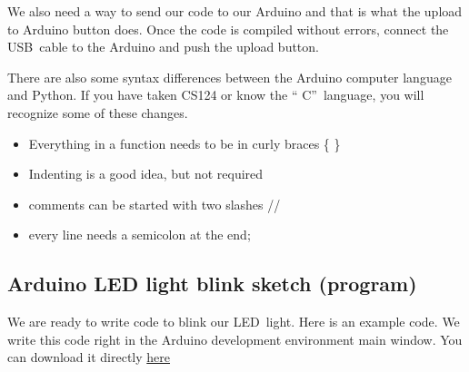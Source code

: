 We also need a way to send our code to our Arduino and that is what the
upload to Arduino button does. Once the code is compiled without errors,
connect the USB\ cable to the Arduino and push the upload button.

There are also some syntax differences between the Arduino computer language
and Python. If you have taken CS124 or know the \textquotedblleft
C\textquotedblright\ language, you will recognize some of these changes.

\begin{itemize}
\item Everything in a function needs to be in curly braces \{ \}

\item Indenting is a good idea, but not required

\item comments can be started with two slashes //

\item every line needs a semicolon at the end;
\end{itemize}

\subsection{Arduino LED light blink sketch (program)}

We are ready to write code to blink our LED\ light. Here is an example code.
We write this code right in the Arduino development environment main window. You can download it directly \href{https://dtoliphant.github.io/PH250Manual/Code/IntroBlink.ino}{here}



% 
% 
% 
% 
% 
% 

